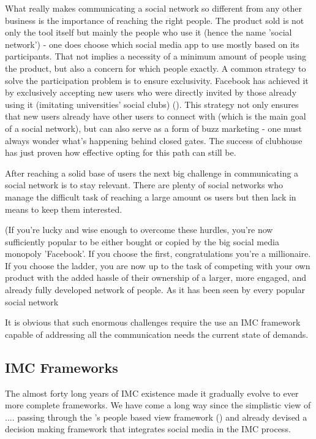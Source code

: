 \documentclass[11pt]{article}
\begin{document}
 What really makes communicating a social network so different from any other business is the importance of reaching the right people. The product sold is not only the tool itself but mainly the people who use it (hence the name 'social network') - one does choose which social media app to use mostly based on its participants. That not implies a necessity of a minimum amount of people using the product, but also a concern for which people exactly. A common strategy to solve the participation problem is to ensure exclusivity. Facebook has achieved it by exclusively accepting new users who were directly invited by those already using it (imitating universities' social clubs) (\cite{zucked}). This strategy not only ensures that new users already have other users to connect with (which is the main goal of a social network), but can also serve as a form of buzz marketing - one must always wonder what's happening behind closed gates. The success of clubhouse has just proven how effective opting for this path can still be.
 
 After reaching a solid base of users the next big challenge in communicating a social network is to stay relevant. There are plenty of social networks who manage the difficult task of reaching a large amount os users but then lack in means to keep them interested.
 
(If you're lucky and wise enough to overcome these hurdles, you're now sufficiently popular to be either bought or copied by the big social media monopoly 'Facebook'. If you choose the first, congratulations you're a millionaire. If you choose the ladder, you are now up to the task of competing with your own product with the added hassle of their ownership of a larger, more engaged, and already fully developed network of people. As it has been seen by every popular social network
 
It is obvious that such enormous challenges require the use an IMC framework capable of addressing all the communication needs the current state of demands. 

 \subsection{IMC Frameworks}\label{fw}
 
 The almost forty long years of IMC existence made it gradually evolve to ever more complete frameworks. We have come a long way since the simplistic view of .... passing through the \citeauthor{kliatchko}'s people based view framework (\citeyear{kliatchko}) and \citeauthor{valos}  already devised a decision making framework that integrates social media in the IMC process. 
\end{document}
